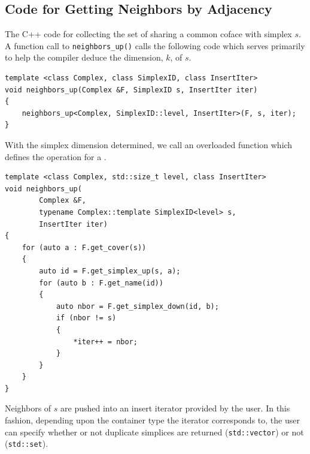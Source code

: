 \subsection{Code for Getting Neighbors by Adjacency}\label{sec:actualneighbor}
\par The C++ code for collecting the set of  sharing a common coface with simplex $s$.
A function call to \verb|neighbors_up()| calls the following code which serves primarily to help the compiler deduce the dimension, $k$, of $s$.
\begin{lstlisting}
template <class Complex, class SimplexID, class InsertIter>
void neighbors_up(Complex &F, SimplexID s, InsertIter iter)
{
    neighbors_up<Complex, SimplexID::level, InsertIter>(F, s, iter);
}
\end{lstlisting}
With the simplex dimension determined, we call an overloaded function which defines the operation for a .
\begin{lstlisting}
template <class Complex, std::size_t level, class InsertIter>
void neighbors_up(
        Complex &F,
        typename Complex::template SimplexID<level> s,
        InsertIter iter)
{
    for (auto a : F.get_cover(s))
    {
        auto id = F.get_simplex_up(s, a);
        for (auto b : F.get_name(id))
        {
            auto nbor = F.get_simplex_down(id, b);
            if (nbor != s)
            {
                *iter++ = nbor;
            }
        }
    }
}
\end{lstlisting}
Neighbors of $s$ are pushed into an insert iterator provided by the user.
In this fashion, depending upon the container type the iterator corresponds to, the user can specify whether or not duplicate simplices are returned (\verb|std::vector|) or not (\verb|std::set|).